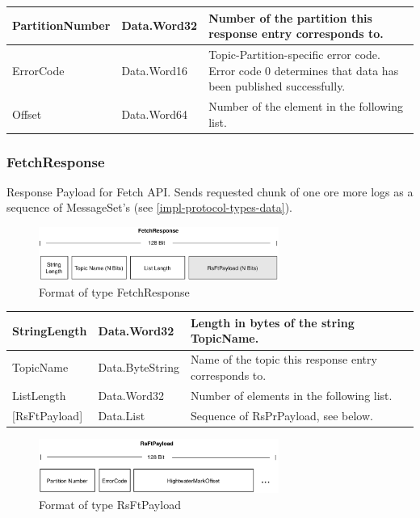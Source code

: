 \begin{table}[H]
\centering
\begin{tabular}{ l  l  p{10cm} }
\hline
PartitionNumber & Data.Word32 & Number of the partition this response entry
corresponds to.                                                \\ \hline
ErrorCode       & Data.Word16 & Topic-Partition-specific error code. Error code
0 determines that data has been published successfully. \\ \hline
Offset          & Data.Word64 & Number of the element in the following list.
\\ \hline
\end{tabular}
\end{table}

\subsubsection{FetchResponse}
Response Payload for Fetch API. Sends requested chunk of one ore more logs as
a sequence of MessageSet's (see \ref{impl-protocol-types-data}). 

\begin{figure}[H]
    \centering
    \includegraphics[width=0.7\textwidth]{images/impl-prot-types-fetchResponse.png}
    \caption{Format of type FetchResponse}
\end{figure}

\begin{table}[H]
\centering
\begin{tabular}{ l  l  p{10cm} }
\hline
StringLength      & Data.Word32     & Length in bytes of the string TopicName. \\ \hline
TopicName         & Data.ByteString & Name of the topic this response entry corresponds to.\\ \hline
ListLength        & Data.Word32     & Number of elements in the following list.\\ \hline
{[}RsFtPayload{]} & Data.List       & Sequence of RsPrPayload, see below.
\\ \hline
\end{tabular}
\end{table}

\begin{figure}[H]
    \centering
    \includegraphics[width=0.7\textwidth]{images/impl-prot-types-ftPayload.png}
    \caption{Format of type RsFtPayload}
\end{figure}


